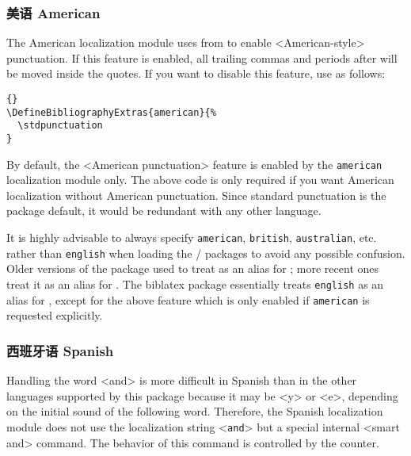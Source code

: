 \subsubsection{美语 American}
\label{use:loc:us}

The American localization module uses  from  to enable <American-style> punctuation. If this feature is enabled, all trailing commas and periods after  will be moved inside the quotes. If you want to disable this feature, use  as follows:

\begin{lstlisting}[style=latex]{}
\DefineBibliographyExtras{american}{%
  \stdpunctuation
}
\end{lstlisting}
%
By default, the <American punctuation> feature is enabled by the \texttt{american} localization module only. The above code is only required if you want American localization without American punctuation. Since standard punctuation is the package default, it would be redundant with any other language.

It is highly advisable to always specify \texttt{american}, \texttt{british}, \texttt{australian}, etc. rather than \texttt{english} when loading the / packages to avoid any possible confusion. Older versions of the  package used to treat  as an alias for ; more recent ones treat it as an alias for . The biblatex package essentially treats \texttt{english} as an alias for , except for the above feature which is only enabled if \texttt{american} is requested explicitly.

\subsubsection{西班牙语 Spanish}
\label{use:loc:esp}

Handling the word <and> is more difficult in Spanish than in the other languages supported by this package because it may be <y> or <e>, depending on the initial sound of the following word. Therefore, the Spanish localization module does not use the localization string <\texttt{and}> but a special internal <smart and> command. The behavior of this command is controlled by the  counter.

